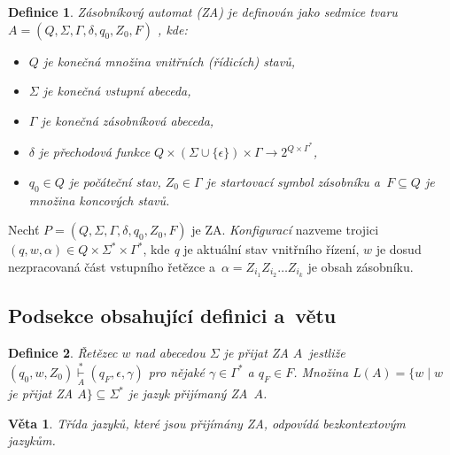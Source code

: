 \documentclass[a4paper, twocolumn, 11pt]{article}
\newtheorem{definicia}{Definice}
\newtheorem{veta}{Věta}
\begin{document}
\begin{definicia}\label{definicia1}
    \emph{Zásobníkový automat} (ZA) je definován jako sedmice tvaru $A = (Q,\Sigma,\Gamma,\delta,q_0,Z_0,F)$ , kde: 
    \begin{itemize}
        \item $Q$ je konečná množina \emph{vnitřních (řídicích) stavů,}
        \item $\Sigma$ je konečná \emph{vstupní abeceda,}
        \item $\Gamma$ je konečná \emph{zásobníková abeceda,}
        \item $\delta$ je \emph{přechodová funkce} $Q\times(\Sigma\cup\{\epsilon\})\times\Gamma\rightarrow 2^{Q\times\Gamma^{*}}$,
        \item $q_0 \in Q$ je \emph{počáteční stav}, $Z_0 \in \Gamma$ je \emph{startovací symbol zásobníku} a~$F \subseteq Q$ je množina \emph{koncových stavů}.
    \end{itemize}
\end{definicia}


Nechť $P = (Q,\Sigma,\Gamma,\delta,q_0,Z_0,F)$ je ZA. \emph{Konfigurací} nazveme trojici $(q,w,\alpha)\in Q \times\Sigma^{*}\times\Gamma^{*}$, kde \emph{q} je aktuální stav vnitřního řízení, $w$ je dosud nezpracovaná část vstupního řetězce a~$\alpha = Z_{i_1}Z_{i_2} \dots Z_{i_k}$ je obsah zásobníku.

\subsection{Podsekce obsahující definici a~větu}
\begin{definicia}
    \emph{Řetězec $w$ nad abecedou $\Sigma$ je přijat ZA} $A$~jestliže $(q_0,w,Z_0) \overset{*}{\underset{A}\vdash} (q_F,\epsilon,\gamma)$ pro nějaké $\gamma \in \Gamma^{*}$ a $q_F \in F$. 
    Množina $L(A)=\{w \mid w$ je přijat ZA $A\} \subseteq \Sigma^{*}$ \emph{je jazyk přijímaný ZA}~$A$.
\end{definicia}
\begin{veta}
Třída jazyků, které jsou přijímány ZA, odpovídá \emph{bezkontextovým jazykům.}
\end{veta}
\end{document}
